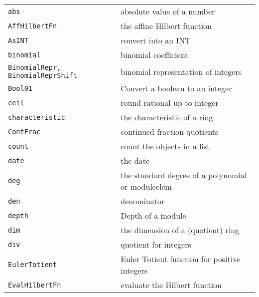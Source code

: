 \documentclass[a4paper]{mybook}
\begin{document}
\begin{center}
\begin{longtable}{ll}
   
{\verb~abs~} &
      absolute value of a number\\
   
{\verb~AffHilbertFn~} &
      the affine Hilbert function\\
   
{\verb~AsINT~} &
      convert into an INT\\
   
{\verb~binomial~} &
      binomial coefficient\\
   
{\verb~BinomialRepr, BinomialReprShift~} &
      binomial representation of integers\\
   
{\verb~Bool01~} &
      Convert a boolean to an integer\\
   
{\verb~ceil~} &
      round rational up to integer\\
   
{\verb~characteristic~} &
      the characteristic of a ring\\
   
{\verb~ContFrac~} &
      continued fraction quotients\\
   
{\verb~count~} &
      count the objects in a list\\
   
{\verb~date~} &
      the date\\
   
{\verb~deg~} &
      the standard degree of a polynomial or moduleelem\\
   
{\verb~den~} &
      denominator\\
   
{\verb~depth~} &
      Depth of a module\\
   
{\verb~dim~} &
      the dimension of a (quotient) ring\\
   
{\verb~div~} &
      quotient for integers\\
   
{\verb~EulerTotient~} &
      Euler Totient function for positive integers\\
   
{\verb~EvalHilbertFn~} &
      evaluate the Hilbert function\\
   

\end{longtable}
\end{center}
\end{document}

